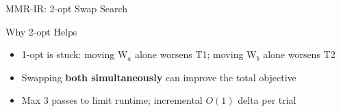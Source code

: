 \documentclass[aspectratio=169,10pt]{beamer}
\begin{document}
\begin{frame}[shrink=5]{MMR-IR: 2-opt Swap Search}
  \begin{exampleblock}{Why 2-opt Helps}
    \small
    \begin{itemize}\setlength\itemsep{2pt}
      \item[\color{goldaccent}$\blacktriangleright$]
        1-opt is stuck: moving W$_a$ alone worsens T1; moving W$_b$ alone worsens T2
      \item[\color{goldaccent}$\blacktriangleright$]
        Swapping \textbf{both simultaneously} can improve the total objective
      \item[\color{goldaccent}$\blacktriangleright$]
        Max 3 passes to limit runtime; incremental $O(1)$ delta per trial
    \end{itemize}
  \end{exampleblock}

\end{frame}


\end{document}
